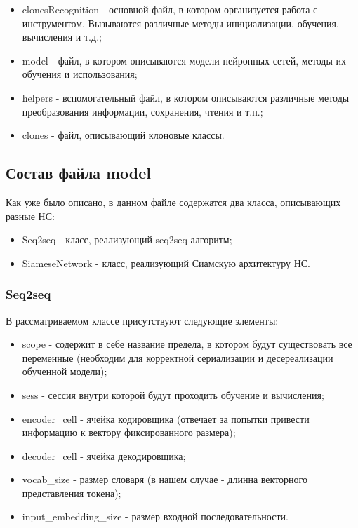 \begin{itemize}
\setlength\itemsep{0mm}
\item clonesRecognition - основной файл, в котором организуется работа с инструментом. Вызываются различные методы инициализации, обучения, вычисления и т.д.;
\item model - файл, в котором описываются модели нейронных сетей, методы их обучения и использования;
\item helpers - вспомогательный файл, в котором описываются различные методы преобразования информации, сохранения, чтения и т.п.;
\item clones - файл, описывающий клоновые классы.
\end{itemize}

\subsection{Состав файла model}

Как уже было описано, в данном файле содержатся два класса, описывающих разные НС:

\begin{itemize}
\setlength\itemsep{0mm}
\item Seq2seq - класс, реализующий seq2seq алгоритм;
\item SiameseNetwork - класс, реализующий Сиамскую архитектуру НС.
\end{itemize}

\subsubsection{Seq2seq}

В рассматриваемом классе присутствуют следующие элементы:

\begin{itemize}
\setlength\itemsep{0mm}
\item scope - содержит в себе название предела, в котором будут существовать все переменные (необходим для корректной сериализации и десереализации обученной модели);
\item sess - сессия внутри которой будут проходить обучение и вычисления;
\item encoder\_cell - ячейка кодировщика (отвечает за попытки привести информацию к вектору фиксированного размера);
\item decoder\_cell - ячейка декодировщика;
\item vocab\_size - размер словаря (в нашем случае - длинна векторного представления токена);
\item input\_embedding\_size - размер входной последовательности.
\end{itemize}

